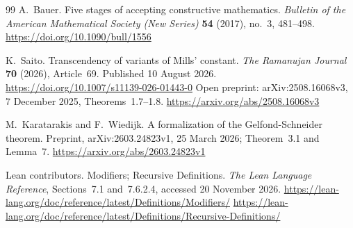 \documentclass[11pt,reqno]{amsart}
\theoremstyle{blueplain}
\numberwithin{equation}{section}
\begin{document}
\begin{thebibliography}{99}
	A.~Bauer.
	Five stages of accepting constructive mathematics.
	\emph{Bulletin of the American Mathematical Society (New Series)}
	\textbf{54} (2017), no.~3, 481--498.
	\url{https://doi.org/10.1090/bull/1556}

	K.~Saito.
	Transcendency of variants of Mills' constant.
	\emph{The Ramanujan Journal} \textbf{70} (2026), Article~69.
	Published 10 August 2026.
	\url{https://doi.org/10.1007/s11139-026-01443-0}
	Open preprint: arXiv:2508.16068v3, 7 December 2025,
	Theorems~1.7--1.8.
	\url{https://arxiv.org/abs/2508.16068v3}

	M.~Karatarakis and F.~Wiedijk.
	A formalization of the Gelfond-Schneider theorem.
	Preprint, arXiv:2603.24823v1, 25 March 2026;
	Theorem~3.1 and Lemma~7.
	\url{https://arxiv.org/abs/2603.24823v1}

	Lean contributors.
	Modifiers; Recursive Definitions.
	\emph{The Lean Language Reference}, Sections~7.1 and~7.6.2.4,
	accessed 20 November 2026.
	\url{https://lean-lang.org/doc/reference/latest/Definitions/Modifiers/}
	\url{https://lean-lang.org/doc/reference/latest/Definitions/Recursive-Definitions/}

\end{thebibliography}
\end{document}
